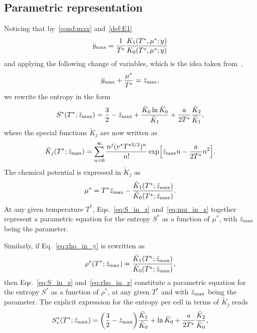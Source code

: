 \documentclass[entropy,article,submit,pdftex,moreauthors]{Definitions/mdpi}
\begin{document}
\subsection{Parametric representation}
Noticing that by~\eqref{cond:max} and~\eqref{def:E1}
\begin{equation}
	\bar{y}_{\rm max} = \frac{1}{T^*}\frac{K_1(T^*,\mu^*;y)}{K_0(T^*,\mu^*;y)}
\end{equation}
and applying the following change of variables, which is the idea taken from~\citep{KD22},
\begin{equation}
	\bar{y}_{\rm max} + \frac{\mu^*}{T^*} = \bar{z}_{\rm max},
\end{equation}
we rewrite the entropy in the form
\begin{equation}
	\label{eq:S_in_z}
	S^*(T^*;\bar{z}_{\rm max}) = \frac{3}{2} - \bar{z}_{\rm max} + \frac{\tilde{K}_0 \ln \tilde{K}_0}{\tilde{K}_1} + \frac{a}{2T^*} \frac{\tilde{K}_2}{\tilde{K}_1},
\end{equation}
where the special functions $\tilde{K}_j$ are now written as
\begin{equation}
	\tilde{K}_j(T^*;\bar{z}_{\rm max}) = \sum_{n=0}^{\infty} \frac{n^j (v^* T^{*3/2})^n}{n!} \exp[\bar{z}_{\rm max}n - \frac{a}{2T^*}n^2].
\end{equation}
The chemical potential is expressed in $\tilde{K}_j$ as
\begin{equation}
	\label{eq:mu_in_z}
	\mu^* = T^* \bar{z}_{\rm max} - \frac{\tilde{K}_1(T^*;\bar{z}_{\rm max})}{\tilde{K}_0(T^*;\bar{z}_{\rm max})}.
\end{equation}
At any given temperature $T^*$, Eqs.~\eqref{eq:S_in_z} and~\eqref{eq:mu_in_z} together represent a parametric equation for the entropy $S^*$ as a function of $\mu^*$, with $\bar{z}_{\rm max}$ being the parameter.

Similarly, if Eq.~\eqref{eq:rho_in_y} is rewritten as
\begin{equation}
	\label{eq:rho_in_z}
	\rho^*(T^*;\bar{z}_{\rm max}) = \frac{\tilde{K}_1(T^*;\bar{z}_{\rm max})}{\tilde{K}_0(T^*;\bar{z}_{\rm max})},
\end{equation}
then Eqs.~\eqref{eq:S_in_z} and~\eqref{eq:rho_in_z} constitute a parametric equation for the entropy $S^*$ as a function of $\rho^*$, at any given $T^*$ and with $\bar{z}_{\rm max}$ being the parameter.
The explicit expression for the entropy per cell in terms of $\tilde{K}_j$ reads
\begin{equation}
	\label{eq:S2_in_z}
	S^*_v(T^*;\bar{z}_{\rm max}) = \left(\frac{3}{2} - \bar{z}_{\rm max}\right) \frac{\tilde{K}_1}{\tilde{K}_0} + \ln \tilde{K}_0 + \frac{a}{2T^*} \frac{\tilde{K}_2}{\tilde{K}_0},
\end{equation}
\end{document}
